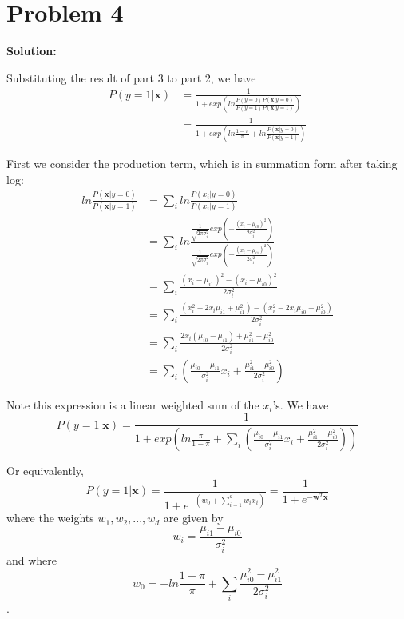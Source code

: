 \documentclass[11pt]{article}
\begin{document}
\section*{Problem 4}
\textbf{Solution:} 

Substituting the result of part 3 to part 2, we have
\begin{align*}
P(y = 1|\bm{x}) &= 
\frac{1}{1 + exp(ln\frac{P(y=0)P(\bm{x}|y=0)}{P(y=1)P(\bm{x}|y=1)})} \\
& = \frac{1}{1 + exp(ln\frac{1-\pi}{\pi} + ln\frac{P(\bm{x}|y = 0)}{P(\bm{x}|y = 1)})}
\end{align*}

First we consider the production term, which is in summation form after taking log:
\begin{align*}
ln\frac{P(\bm{x}|y = 0)}{P(\bm{x}|y = 1)} &= \sum_i ln\frac{P(x_i|y = 0)}{P(x_i|y = 1)}\\
&= \sum_i ln \frac{\frac{1}{\sqrt{2\pi \sigma_i^2}}exp(-\frac{(x_i - \mu_{i0})^2}{2\sigma_i^2})}{\frac{1}{\sqrt{2\pi \sigma_i^2}}exp(-\frac{(x_i - \mu_{i1})^2}{2\sigma_i^2})}\\
&= \sum_i \frac{(x_i - \mu_{i1})^2 - (x_i - \mu_{i0})^2}{2\sigma_i^2}\\
&= \sum_i \frac{(x_i^2 - 2x_i\mu_{i1} + \mu_{i1}^2) - (x_i^2 - 2x_i\mu_{i0}+ \mu_{i0}^2)}{2\sigma_i^2}\\
&= \sum_i \frac{2x_i(\mu_{i0} - \mu_{i1}) + \mu_{i1}^2 - \mu_{i0}^2}{2\sigma_i^2}\\
&= \sum_i (\frac{\mu_{i0}-\mu_{i1}}{\sigma_i^2}x_i + \frac{\mu_{i1}^2 - \mu_{i0}^2}{2\sigma_i^2})
\end{align*}

Note this expression is a linear weighted sum of the $x_i$'s. We have
$$P(y = 1|\bm{x}) = \frac{1}{1 + exp(ln\frac{\pi}{1 - \pi} + \sum_i(\frac{\mu_{i0}-\mu_{i1}}{\sigma_i^2}x_i + \frac{\mu_{i1}^2 - \mu_{i0}^2}{2\sigma_i^2}))}$$

Or equivalently,
$$P(y = 1|\bm{x}) = \frac{1}{1 + e^{-(w_0 + \sum_{i = 1}^d w_ix_i)}} = \frac{1}{1 + e^{-\bm{w}^T \bm{x}}}$$
where the weights $w_1, w_2, ..., w_d$ are given by
$$w_i = \frac{\mu_{i1}-\mu_{i0}}{\sigma_i^2}$$
and where
$$w_0 = -ln\frac{1-\pi}{\pi} + \sum_i \frac{\mu_{i0}^2 - \mu_{i1}^2}{2\sigma_i^2}$$.
\end{document}

